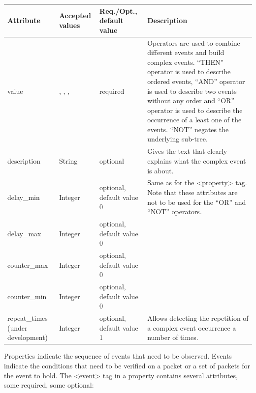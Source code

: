 \begin{table}[H]
\label{op_att}
    \begin{adjustwidth}{-2in}{-.5in} 
        \begin{center}
\begin{supertabular}{|m{1.0281599in}|m{1.0281599in}|m{1.0281599in}|m{3.44206in}|}
\hline
{}
 Attribute &
 Accepted values &
 Req./Opt., default value &
 Description
\\\hline
value &
,
,
,
 &
required &
Operators are used to combine different events and build complex events.
{\textquotedblleft}THEN{\textquotedblright} operator is used to
describe ordered events, {\textquotedblleft}AND{\textquotedblright}
operator is used to describe two events without any order and
{\textquotedblleft}OR{\textquotedblright} operator is used to describe
the occurrence of a least one of the events. {\textquotedblleft}NOT{\textquotedblright} negates the underlying sub-tree.\\\hline
description &
String &
optional &
Gives the text that clearly explains what the complex event is
about.\\\hline
delay\_min &
Integer &
optional, default value 0 &
Same as for the {\textless}property{\textgreater} tag. Note that these
attributes are not to be used for the
{\textquotedblleft}OR{\textquotedblright} and {\textquotedblleft}NOT{\textquotedblright} operators.
\\\hhline{---~}
delay\_max &
Integer &
optional, default value 0 &
\\\hhline{---~}
counter\_max &
Integer &
optional, default value 0 &
\\\hhline{---~}
counter\_min &
Integer &
optional, default value 0 &
\\\hline
repeat\_times (under development) &
Integer &
optional, default value 1 &
Allows detecting the repetition of a complex event occurrence a number of times.\\\hline
\end{supertabular}
        \end{center}
    \end{adjustwidth}
\end{table}

 Properties indicate the sequence of events that need to be observed. Events
indicate the conditions that need to be verified on a packet or a set of packets for the event to hold. The {\textless}event{\textgreater} tag in a property
contains several attributes, some required, some optional:


